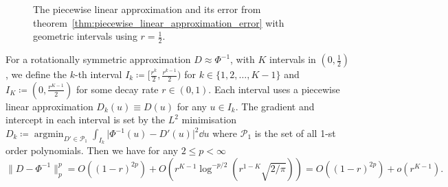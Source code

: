 \documentclass[manuscript,review]{acmart}
\DeclareMathOperator*{\argmin}{argmin} %
\begin{document}
\begin{figure}[htb]
\centering

\hfill
{} \hfill 
{}\hfill

\caption{The piecewise linear approximation and its error from theorem~\ref{thm:piecewise_linear_approximation_error} with geometric intervals using $ r = \tfrac{1}{2} $.}
\label{fig:piecewise_linear_approximation}
\end{figure}

\begin{theorem}
\label{thm:piecewise_linear_approximation_error}
For a rotationally symmetric approximation $ D \approx \Phi^{-1}$, with $ K $ intervals in $ (0, \tfrac{1}{2}) $, we define the $ k $-th interval $ I_k \coloneqq [\tfrac{r^k}{2}, \tfrac{r^{k-1}}{2})$ for $ k \in \{1,2,\ldots, K-1\} $ and $ I_K \coloneqq (0, \tfrac{r^{K-1}}{2}) $ for some decay rate $ r \in(0,1) $. Each interval uses a piecewise linear approximation $ D_k(u) \equiv D(u) $ for any $ u \in I_k $. The gradient and intercept in each interval is set by the $ L^2 $ minimisation $ D_k \coloneqq \argmin_{D' \in \mathcal{P}_1} \int_{I_k}\lvert\Phi^{-1}(u) - D'(u)\rvert^2 \dd{u} $ where $ \mathcal{P}_1 $  is the set of all 1-st order polynomials. Then we have for any $ 2 \leq p < \infty  $
\begin{equation*}
\lVert D - \Phi^{-1}\rVert_p^p 
= O((1-r)^{2p}) +
O(r^{K-1} {\log}^{-p/2}(r^{1-K}\sqrt{2/\pi}))  = O((1-r)^{2p}) +
o(r^{K-1}).
\end{equation*}
\end{theorem}
\end{document}
